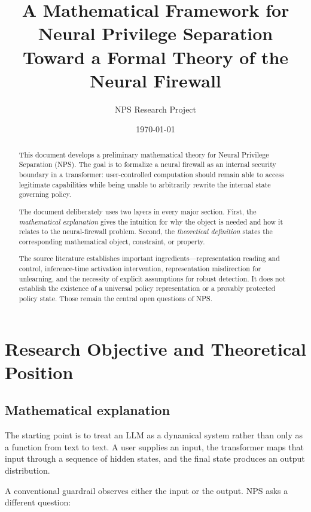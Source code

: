 \documentclass[11pt]{article}
\title{\textbf{A Mathematical Framework for Neural Privilege Separation}\\
\large Toward a Formal Theory of the Neural Firewall}
\author{NPS Research Project}
\date{\today}
\begin{document}
\maketitle

\begin{abstract}
This document develops a preliminary mathematical theory for Neural Privilege
Separation (NPS). The goal is to formalize a neural firewall as an internal
security boundary in a transformer: user-controlled computation should remain
able to access legitimate capabilities while being unable to arbitrarily
rewrite the internal state governing policy.

The document deliberately uses two layers in every major section. First,
the \emph{mathematical explanation} gives the intuition for why the object is
needed and how it relates to the neural-firewall problem. Second, the
\emph{theoretical definition} states the corresponding mathematical object,
constraint, or property.

The source literature establishes important ingredients---representation
reading and control, inference-time activation intervention, representation
misdirection for unlearning, and the necessity of explicit assumptions for
robust detection. It does not establish the existence of a universal policy
representation or a provably protected policy state. Those remain the central
open questions of NPS.
\end{abstract}

\tableofcontents
\newpage

\section{Research Objective and Theoretical Position}

\subsection*{Mathematical explanation}

The starting point is to treat an LLM as a dynamical system rather than only
as a function from text to text. A user supplies an input, the transformer
maps that input through a sequence of hidden states, and the final state
produces an output distribution.

A conventional guardrail observes either the input or the output. NPS asks a
different question:
\end{document}
